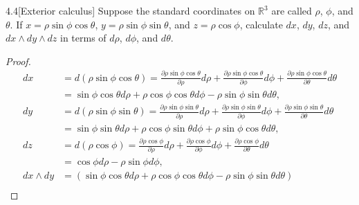 \begin{problem}{4.4}[Exterior calculus]
Suppose the standard coordinates on \(\mathbb{R}^{3}\) are called \(\rho\), \(\phi\), and \(\theta\). If \(x = \rho\sin\phi\cos\theta\), \(y = \rho\sin\phi\sin\theta\), and \(z = \rho\cos\phi\), calculate \(dx\), \(dy\), \(dz\), and \(dx \wedge dy \wedge dz\) in terms of \(d\rho\), \(d\phi\), and \(d\theta\).
\end{problem}

\begin{proof}
    \begingroup
    \allowdisplaybreaks%
    \begin{align*}
        dx                     & = d(\rho\sin\phi\cos\theta) = \frac{\partial \rho\sin\phi\cos\theta}{\partial\rho} d\rho + \frac{\partial \rho\sin\phi\cos\theta}{\partial\phi} d\phi + \frac{\partial \rho\sin\phi\cos\theta}{\partial\theta} d\theta \\
                               & = \sin\phi\cos\theta d\rho + \rho\cos\phi\cos\theta d\phi - \rho\sin\phi\sin\theta d\theta,                                                                                                                            \\
        dy                     & = d(\rho\sin\phi\sin\theta) = \frac{\partial \rho\sin\phi\sin\theta}{\partial\rho} d\rho + \frac{\partial \rho\sin\phi\sin\theta}{\partial\phi} d\phi + \frac{\partial \rho\sin\phi\sin\theta}{\partial\theta} d\theta \\
                               & = \sin\phi\sin\theta d\rho + \rho\cos\phi\sin\theta d\phi + \rho\sin\phi\cos\theta d\theta,                                                                                                                            \\
        dz                     & = d(\rho\cos\phi) = \frac{\partial \rho\cos\phi}{\partial\rho} d\rho + \frac{\partial \rho\cos\phi}{\partial\phi} d\phi + \frac{\partial \rho\cos\phi}{\partial\theta} d\theta                                         \\
                               & = \cos\phi d\rho - \rho\sin\phi d\phi,                                                                                                                                                                                 \\
        dx \wedge dy           & = (\sin\phi\cos\theta d\rho + \rho\cos\phi\cos\theta d\phi - \rho\sin\phi\sin\theta d\theta)                                                                                                                           \\

\end{align*}
\end{proof}
